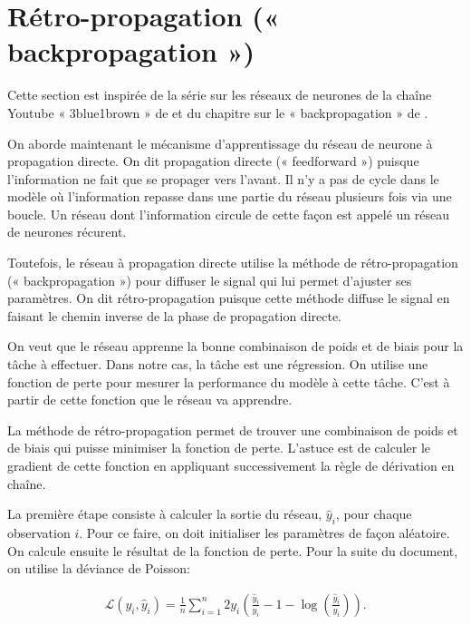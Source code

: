 \section{Rétro-propagation (« backpropagation ») }
\label{sec:RN:back}

Cette section est inspirée de la série sur les réseaux de neurones de la chaîne Youtube « 3blue1brown » de \citet{3blue1brown} et du chapitre sur le « backpropagation » de \citet{nielsen2015neural}.

On aborde maintenant le mécanisme d'apprentissage du réseau de neurone à propagation directe. On dit propagation directe (« feedforward ») puisque l'information ne fait que se propager vers l'avant. Il n'y a pas de cycle dans le modèle où l'information repasse dans une partie du réseau plusieurs fois via une boucle. Un réseau dont l'information circule de cette façon est appelé un réseau de neurones récurent. 

Toutefois, le réseau à propagation directe utilise la méthode de rétro-propagation (« backpropagation ») pour diffuser le signal qui lui permet d'ajuster ses paramètres.  On dit rétro-propagation puisque cette méthode diffuse le signal en faisant le chemin inverse de la phase de propagation directe.

On veut que le réseau apprenne la bonne combinaison de poids et de biais pour la tâche à effectuer. Dans notre cas, la tâche est une régression. On utilise une fonction de perte pour mesurer la performance du modèle à cette tâche. C'est à partir de cette fonction que le réseau va apprendre. 

La méthode de rétro-propagation permet de trouver une combinaison de poids et de biais qui puisse minimiser la fonction de perte. L'astuce est de calculer le gradient de cette fonction en appliquant successivement la règle de dérivation en chaîne. 



La première étape consiste à calculer la sortie du réseau, $\hat{y}_i$, pour chaque observation $i$. Pour ce faire, on doit initialiser les paramètres de façon aléatoire. On calcule ensuite le résultat de la fonction de perte. Pour la suite du document, on utilise la déviance de Poisson:

\begin{align*}
\mathcal{L}(y_i,\hat{y}_i) = \frac{1}{n} \sum_{i=1}^n 2 y_i \left( \frac{\hat{y}_i}{y_i} -1 - \log\left(\frac{\hat{y}_i}{y_i}\right) \right).
\end{align*}

